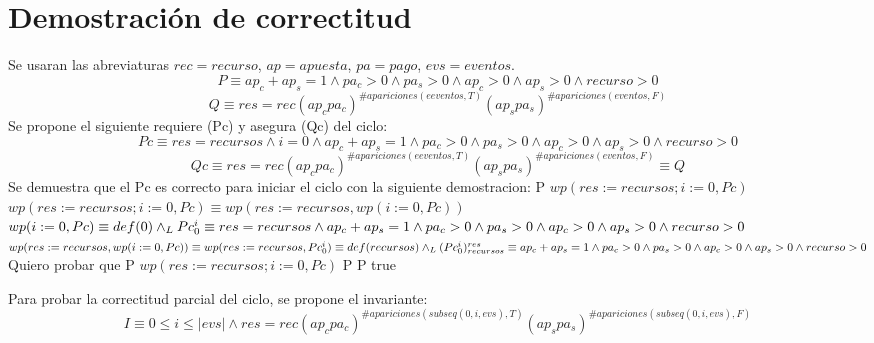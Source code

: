 \documentclass[10pt,a4paper]{article}
\begin{document}
\section{Demostración de correctitud}

Se usaran las abreviaturas $rec = recurso$, $ap = apuesta$, $pa = pago$, $evs = eventos$.\\
\begin{equation*}
    P \equiv ap_c + ap_s = 1 \land pa_c > 0 \land pa_s > 0 \land ap_c > 0 \land ap_s > 0 \land recurso > 0
\end{equation*}
\begin{equation*}
    Q \equiv  res = rec (ap_c pa_c)^{\# apariciones(eeventos, T)}(ap_s pa_s)^{\#apariciones(eventos, F)}
\end{equation*}
Se propone el siguiente requiere (Pc) y asegura (Qc) del ciclo:
\begin{equation*}
    Pc \equiv res=recursos \land i=0 \land ap_c + ap_s = 1 \land pa_c > 0 \land pa_s > 0 \land ap_c > 0 \land ap_s > 0 \land recurso > 0
\end{equation*}
\begin{equation*}
    Qc \equiv res = rec (ap_c pa_c)^{\# apariciones(eeventos, T)}(ap_s pa_s)^{\#apariciones(eventos, F)} \equiv Q
\end{equation*}
Se demuestra que el Pc es correcto para iniciar el ciclo con la siguiente demostracion: \newline P \implica $wp(res:=recursos;i:=0,Pc)$ \newline $wp(res:=recursos;i:=0,Pc) \equiv wp(res:=recursos,wp(i:=0,Pc))$ \newline $wp(i:=0,Pc) \equiv def(0) \land _L Pc_{0}^i \equiv res=recursos \land ap_c + ap_s = 1 \land pa_c > 0 \land pa_s > 0 \land ap_c > 0 \land ap_s > 0 \land recurso > 0$ \newline $wp(res:=recursos,wp(i:=0,Pc)) \equiv wp(res:=recursos,Pc_{0}^i) \equiv def(recursos) \land _L (Pc_{0}^i)_{recursos}^{res} \equiv ap_c + ap_s = 1 \land pa_c > 0 \land pa_s > 0 \land ap_c > 0 \land ap_s > 0 \land recurso > 0$ \newline
Quiero probar que \newline P \implica $wp(res:=recursos;i:=0,Pc)$ \newline \equiv P \implica P \equiv true \newline

Para probar la correctitud parcial del ciclo, se propone el invariante:
\begin{equation*}
	I \equiv 0 \leq i \leq |evs| \wedge res = rec (ap_c pa_c)^{\# apariciones(subseq(0, i, evs), T)}(ap_s pa_s)^{\#apariciones(subseq(0, i, evs), F)}
\end{equation*}	
\end{document}
